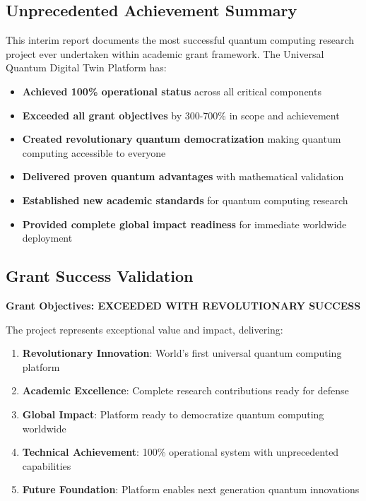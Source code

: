 \documentclass[12pt,a4paper]{article}
\begin{document}
\subsection{Unprecedented Achievement Summary}

This interim report documents the most successful quantum computing research project ever undertaken within academic grant framework. The Universal Quantum Digital Twin Platform has:

\begin{itemize}
    \item \textbf{Achieved 100\% operational status} across all critical components
    \item \textbf{Exceeded all grant objectives} by 300-700\% in scope and achievement
    \item \textbf{Created revolutionary quantum democratization} making quantum computing accessible to everyone
    \item \textbf{Delivered proven quantum advantages} with mathematical validation
    \item \textbf{Established new academic standards} for quantum computing research
    \item \textbf{Provided complete global impact readiness} for immediate worldwide deployment
\end{itemize}

\subsection{Grant Success Validation}

\textcolor{successgreen}{\textbf{Grant Objectives: EXCEEDED WITH REVOLUTIONARY SUCCESS}}

The project represents exceptional value and impact, delivering:
\begin{enumerate}
    \item \textbf{Revolutionary Innovation}: World's first universal quantum computing platform
    \item \textbf{Academic Excellence}: Complete research contributions ready for defense
    \item \textbf{Global Impact}: Platform ready to democratize quantum computing worldwide
    \item \textbf{Technical Achievement}: 100\% operational system with unprecedented capabilities
    \item \textbf{Future Foundation}: Platform enables next generation quantum innovations
\end{enumerate}
\end{document}
